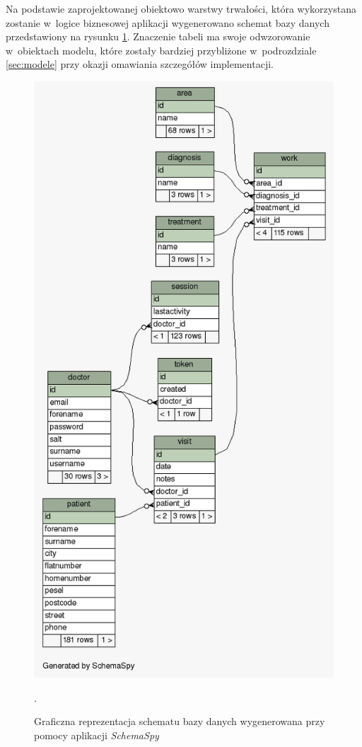 \documentclass[11pt]{aghdpl}
\begin{document}
Na podstawie zaprojektowanej obiektowo warstwy trwałości, która wykorzystana zostanie w~logice biznesowej aplikacji wygenerowano schemat bazy danych przedstawiony na rysunku \ref{fig:dbschema}. Znaczenie tabeli ma swoje odwzorowanie w~obiektach modelu, które zostały bardziej przybliżone w~podrozdziale \ref{sec:modele} przy okazji omawiania szczegółów implementacji.

\begin{figure}[h!]
	\centering
	\includegraphics[height=\textheight * 4/5]{dbschema}
	\caption{Graficzna reprezentacja schematu bazy danych wygenerowana przy pomocy aplikacji \emph{SchemaSpy}}.
	\label{fig:dbschema}
\end{figure}
\end{document}
